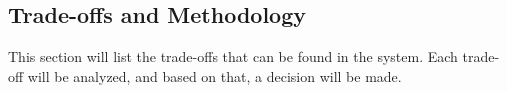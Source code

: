 \subsection{Trade-offs and Methodology} 
\label{ssec:trade_offs_and_methodology}
This section will list the trade-offs that can be found in the system. Each trade-off will be analyzed, and based on that, a decision will be made.















% 










